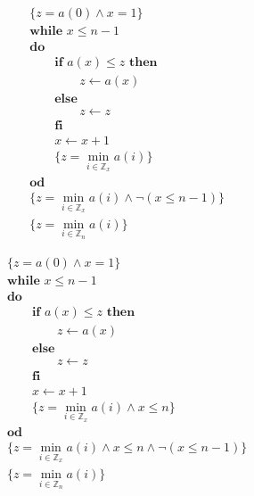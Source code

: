 \begin{frame}
  \begin{align*}
    &\{z = a(0) \land x = 1\} \\
    &\textbf{while } x \leq n - 1  \\
    &\textbf{do } \\
    &\qquad \textbf{if } a(x) \leq z \textbf{ then}\\
    &\qquad\qquad z\leftarrow a(x) \\
    &\qquad\textbf{else}\\
    &\qquad\qquad z\leftarrow z \\
    &\qquad\textbf{fi}\\
    &\qquad x\leftarrow x+1 \\
    &\qquad \{z = \min_{i \in \mathbb{Z}_{x}} a(i)\} \\
    &\textbf{od } \\
    &\{z = \min_{i \in \mathbb{Z}_x} a(i) \land \lnot (x \leq n - 1)\} \\
    &\{z = \min_{i \in \mathbb{Z}_n} a(i)\}
  \end{align*}
\end{frame}

\begin{frame}
  \begin{align*}
    &\{z = a(0) \land x = 1\} \\
    &\textbf{while } x \leq n - 1  \\
    &\textbf{do } \\
    &\qquad \textbf{if } a(x) \leq z \textbf{ then}\\
    &\qquad\qquad z\leftarrow a(x) \\
    &\qquad\textbf{else}\\
    &\qquad\qquad z\leftarrow z \\
    &\qquad\textbf{fi}\\
    &\qquad x\leftarrow x+1 \\
    &\qquad \{z = \min_{i \in \mathbb{Z}_{x}} a(i) \land x \leq n\} \\
    &\textbf{od } \\
    &\{z = \min_{i \in \mathbb{Z}_x} a(i) \land x \leq n \land \lnot (x \leq n - 1)\} \\
    &\{z = \min_{i \in \mathbb{Z}_n} a(i)\}
  \end{align*}
\end{frame}

